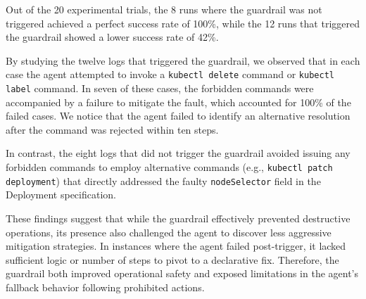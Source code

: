 Out of the 20 experimental trials, the 8 runs where the guardrail was not triggered achieved a perfect success rate of 100\%, while the 12 runs that triggered the guardrail showed a lower success rate of 42\%.

 By studying the twelve logs that triggered the guardrail, we observed that in each case the agent attempted to invoke a \texttt{kubectl delete} command or \texttt{kubectl label} command. In seven of these cases, the forbidden commands were accompanied by a failure to mitigate the fault, which accounted for 100\% of the failed cases.  We notice that the agent failed to identify an alternative resolution after the command was rejected within ten steps. 
 
 In contrast, the eight logs that did not trigger the guardrail avoided issuing any forbidden commands to employ alternative commands (e.g., \texttt{kubectl patch deployment}) that directly addressed the faulty \texttt{nodeSelector} field in the Deployment specification. 



These findings suggest that while the guardrail effectively prevented destructive operations, its presence also challenged the agent to discover less aggressive mitigation strategies. In instances where the agent failed post-trigger, it lacked sufficient logic or number of steps to pivot to a declarative fix. Therefore, the guardrail both improved operational safety and exposed limitations in the agent's fallback behavior following prohibited actions.